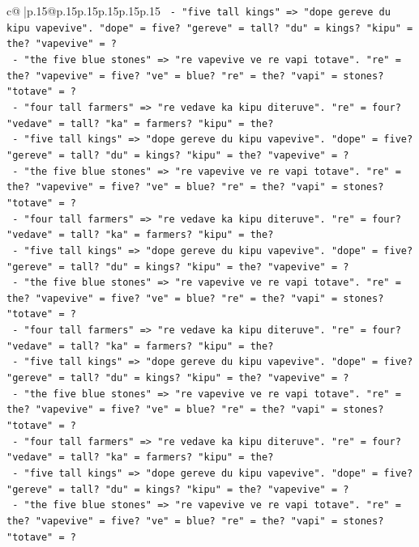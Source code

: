 \documentclass{article}
\begin{document}
{\begin{supertabular}{c@{$\;$}|p{.15\linewidth}@{}p{.15\linewidth}p{.15\linewidth}p{.15\linewidth}p{.15\linewidth}p{.15\linewidth}}
{{{\texttt{    {-} "five tall kings" => "dope gereve du kipu vapevive". "dope" = five? "gereve" = tall? "du" = kings? "kipu" = the? "vapevive" = ?} \\
\texttt{    {-} "the five blue stones" => "re vapevive ve re vapi totave". "re" = the? "vapevive" = five? "ve" = blue? "re" = the? "vapi" = stones? "totave" = ?} \\
\texttt{    {-} "four tall farmers" => "re vedave ka kipu diteruve". "re" = four? "vedave" = tall? "ka" = farmers? "kipu" = the?} \\
\texttt{    {-} "five tall kings" => "dope gereve du kipu vapevive". "dope" = five? "gereve" = tall? "du" = kings? "kipu" = the? "vapevive" = ?} \\
\texttt{    {-} "the five blue stones" => "re vapevive ve re vapi totave". "re" = the? "vapevive" = five? "ve" = blue? "re" = the? "vapi" = stones? "totave" = ?} \\
\texttt{    {-} "four tall farmers" => "re vedave ka kipu diteruve". "re" = four? "vedave" = tall? "ka" = farmers? "kipu" = the?} \\
\texttt{    {-} "five tall kings" => "dope gereve du kipu vapevive". "dope" = five? "gereve" = tall? "du" = kings? "kipu" = the? "vapevive" = ?} \\
\texttt{    {-} "the five blue stones" => "re vapevive ve re vapi totave". "re" = the? "vapevive" = five? "ve" = blue? "re" = the? "vapi" = stones? "totave" = ?} \\
\texttt{    {-} "four tall farmers" => "re vedave ka kipu diteruve". "re" = four? "vedave" = tall? "ka" = farmers? "kipu" = the?} \\
\texttt{    {-} "five tall kings" => "dope gereve du kipu vapevive". "dope" = five? "gereve" = tall? "du" = kings? "kipu" = the? "vapevive" = ?} \\
\texttt{    {-} "the five blue stones" => "re vapevive ve re vapi totave". "re" = the? "vapevive" = five? "ve" = blue? "re" = the? "vapi" = stones? "totave" = ?} \\
\texttt{    {-} "four tall farmers" => "re vedave ka kipu diteruve". "re" = four? "vedave" = tall? "ka" = farmers? "kipu" = the?} \\
\texttt{    {-} "five tall kings" => "dope gereve du kipu vapevive". "dope" = five? "gereve" = tall? "du" = kings? "kipu" = the? "vapevive" = ?} \\
\texttt{    {-} "the five blue stones" => "re vapevive ve re vapi totave". "re" = the? "vapevive" = five? "ve" = blue? "re" = the? "vapi" = stones? "totave" = ?} \\
}}}
\end{supertabular}}
\end{document}
